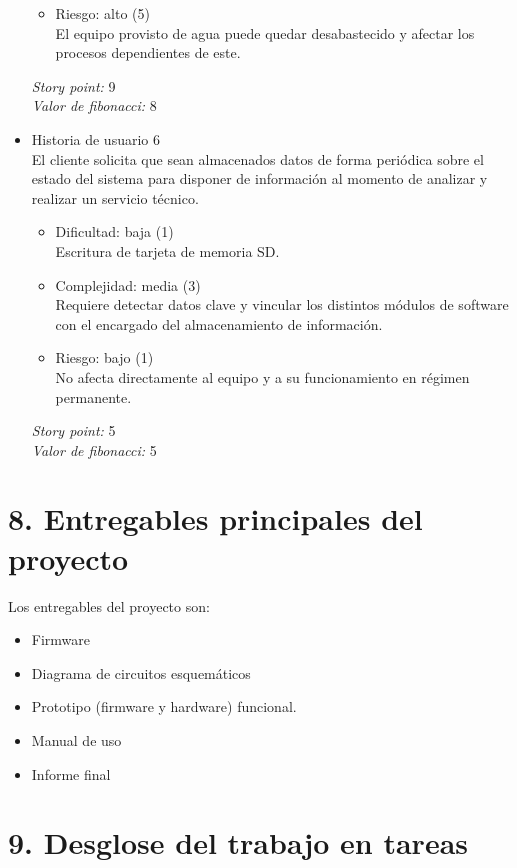 \documentclass[
11pt, %
]{charter}
\begin{document}
\begin{itemize}
\begin{itemize}
		\item Riesgo: alto (5)
		\\El equipo provisto de agua puede quedar desabastecido y afectar los procesos dependientes de este.
	\end{itemize}
\textit{Story point:} 9\\
\textit{Valor de fibonacci:} 8
\item  Historia de usuario 6
\\El cliente solicita que sean almacenados datos de forma periódica sobre el estado del sistema para disponer de información al momento de analizar y realizar un servicio técnico.
	\begin{itemize}
		\item Dificultad: baja (1)
		\\Escritura de tarjeta de memoria SD.
		\item Complejidad: media (3)
		\\Requiere detectar datos clave y vincular los distintos módulos de software con el encargado del almacenamiento de información.
		\item Riesgo: bajo (1)
		\\No afecta directamente al equipo y a su funcionamiento en régimen permanente.
	\end{itemize}
\textit{Story point:} 5\\
\textit{Valor de fibonacci:} 5

\end{itemize}

\section{8. Entregables principales del proyecto}
\label{sec:entregables}

Los entregables del proyecto son:

\begin{itemize}
	\item Firmware
	\item Diagrama de circuitos esquemáticos
	\item Prototipo (firmware y hardware) funcional.
	\item Manual de uso
	\item Informe final
\end{itemize}

\section{9. Desglose del trabajo en tareas}
\label{sec:wbs}
\end{document}
